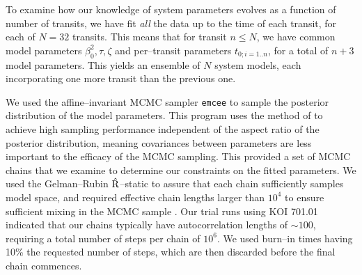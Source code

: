 
To examine how our knowledge of system parameters evolves as a
function of number of transits, we have fit {\it all} the data up to
the time of each transit, for each of $N = 32$ transits.  This means
that for transit $n \leq N$, we have common model parameters
$\beta_{0}^2, \tau, \zeta$ and per--transit parameters $t_{0;i=1..n}$,
for a total of $n+3$ model parameters.  This yields an ensemble of $N$
system models, each incorporating one more transit than the previous
one.

We used the affine--invariant MCMC sampler {\tt emcee}
\citep{2013PASP..125..306F} to sample the posterior distribution of
the model parameters.  This program uses the method of
\cite{Goodman-Weare} to achieve high sampling performance independent
of the aspect ratio of the posterior distribution, meaning covariances
between parameters are less important to the efficacy of the MCMC
sampling.  This provided a set of MCMC chains that we examine to
determine our constraints on the fitted parameters.  We used the
Gelman--Rubin $\hat{\rm R}$--static \citep{Gelman92} to assure that
each chain sufficiently samples model space, and required effective
chain lengths larger than $10^4$ to ensure sufficient mixing in the
MCMC sample \cite[e.g.][]{2004PhRvD..69j3501T}.  Our trial runs using
KOI 701.01 indicated that our chains typically have autocorrelation
lengths of $\sim 100$, requiring a total number of steps per chain of
$10^6$.  We used burn--in times having 10\% the requested number of
steps, which are then discarded before the final chain commences.

